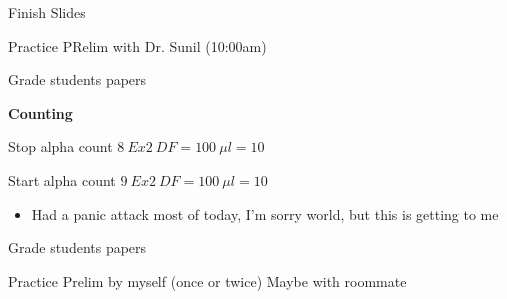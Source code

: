 \documentclass[idxtotoc,hyperref,openany,oneside]{labbook} %
\newcommand{\cmark}{\ding{51}}%
\newcommand{\done}{\rlap{$\square$}{\raisebox{2pt}{\large\hspace{1pt}\cmark}}%
  \hspace{-2.5pt}}
\begin{document}
\begin{todolist}
\item[\done]{Finish Slides}
\end{todolist}




\begin{todolist}
\item[\done]{Practice PRelim with Dr. Sunil (10:00am)}
\end{todolist}

\begin{todolist}
\item{Grade students papers}
\end{todolist}


\textbf{Counting}
\begin{todolist}
\item[\done]{Stop alpha count $\boxed{8\ Ex2\ DF=100\ \mu l=10}$}
\item[\done]{Start alpha count $\boxed{9\ Ex2\ DF=100\ \mu l=10}$}
\end{todolist}





\begin{itemize}
\item{Had a panic attack most of today, I'm sorry world, but this is
  getting to me}
\end{itemize}

\begin{todolist}
\item{Grade students papers}
\end{todolist}






\begin{todolist}
\item[\done]{Practice Prelim by myself (once or twice) Maybe with roommate}
\end{todolist}
\end{document}
